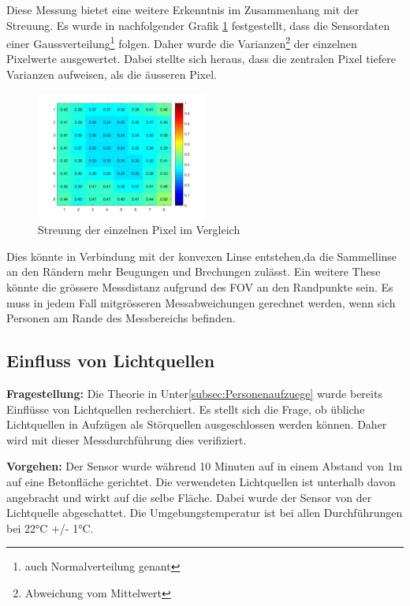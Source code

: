 Diese Messung bietet eine weitere Erkenntnis im Zusammenhang mit der Streuung. Es wurde in nachfolgender Grafik \ref{fig:Streuung} festgestellt, dass die Sensordaten einer Gaussverteilung\footnote[14]{auch Normalverteilung genant} folgen. Daher wurde die Varianzen\footnote[15]{Abweichung vom Mittelwert} der einzelnen Pixelwerte ausgewertet. Dabei stellte sich heraus, dass die zentralen Pixel tiefere Varianzen aufweisen, als die äusseren Pixel.

\begin{figure}[H]
	\centering
	\includegraphics[width=0.5\textwidth]
	{fig/Distanz_140cm_std_.jpg}
	\caption[Streuung der einzelnen Pixel im Vergleich]{Streuung der einzelnen Pixel im Vergleich}
	\label{fig:Streuung}
\end{figure}

Dies könnte in Verbindung mit der konvexen Linse entstehen,da die Sammellinse an den Rändern mehr Beugungen und Brechungen zulässt. Ein weitere These könnte die grössere Messdistanz aufgrund des \ac{FOV} an den Randpunkte sein. Es muss in jedem Fall mitgrösseren Messabweichungen gerechnet werden, wenn sich Personen am Rande des Messbereichs befinden.

\subsection{Einfluss von Lichtquellen}
\textbf{Fragestellung:} Die Theorie in Unter\ref{subsec:Personenaufzuege} wurde bereits Einflüsse von Lichtquellen recherchiert. Es stellt sich die Frage, ob übliche Lichtquellen in Aufzügen als Störquellen ausgeschlossen werden können. Daher wird mit dieser Messdurchführung dies verifiziert.

\textbf{Vorgehen:} Der Sensor wurde während 10 Minuten auf in einem Abstand von 1m auf eine Betonfläche gerichtet. Die verwendeten Lichtquellen ist unterhalb davon angebracht und wirkt auf die selbe Fläche. Dabei wurde der Sensor von der Lichtquelle abgeschattet. Die Umgebungstemperatur ist bei allen Durchführungen bei 22°C +/- 1°C.


